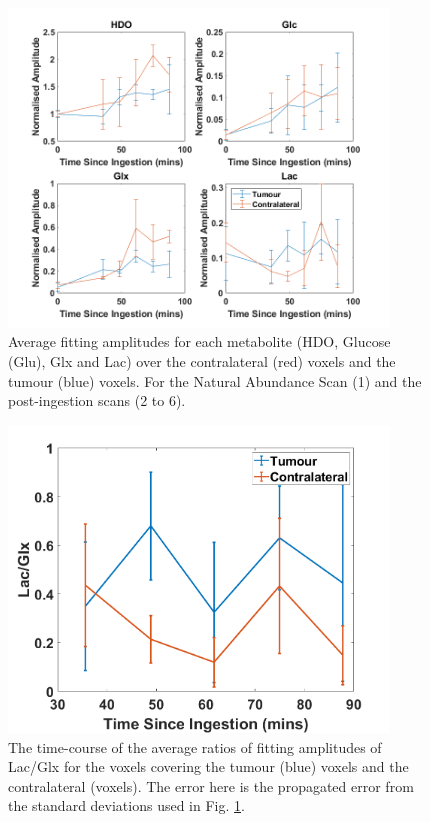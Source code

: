 \begin{figure}[H]
    \centering
    \includegraphics[width = 0.9\textwidth]{Figures/Conclusion/Time_Course.png}
    \caption{Average fitting amplitudes for each metabolite (HDO, Glucose (Glu), Glx and Lac) over the contralateral (red) voxels and the tumour (blue) voxels. For the Natural Abundance Scan (1) and the post-ingestion scans (2 to 6).}
    \label{fig:Conc:Time}
\end{figure}

\begin{figure}[H]
    \centering
    \includegraphics[width = 0.9\textwidth]{Figures/Conclusion/Ratio_TimeCourse.png}
    \caption{The time-course of the average ratios of fitting amplitudes of Lac/Glx for the voxels covering the tumour (blue) voxels and the contralateral (voxels). The error here is the propagated error from the standard deviations used in Fig. \ref{fig:Conc:Time}.}
    \label{fig:Conc:Time_Rat}
\end{figure}

